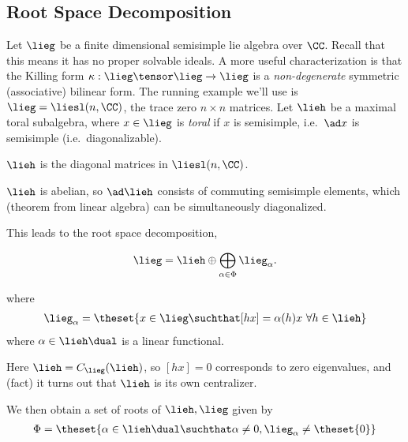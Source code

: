 \hypertarget{root-space-decomposition}{%
\subsection{Root Space Decomposition}\label{root-space-decomposition}}

Let \(\lieg\) be a finite dimensional semisimple lie algebra over
\(\CC\). Recall that this means it has no proper solvable ideals. A more
useful characterization is that the Killing form
\(\kappa: \lieg\tensor \lieg \to \lieg\) is a \emph{non-degenerate}
symmetric (associative) bilinear form. The running example we'll use is
\(\lieg = \liesl(n, \CC)\), the trace zero \(n\times n\) matrices. Let
\(\lieh\) be a maximal toral subalgebra, where \(x\in\lieg\) is
\emph{toral} if \(x\) is semisimple, i.e.~\(\ad x\) is semisimple
(i.e.~diagonalizable).

\begin{example}[?]

\(\lieh\) is the diagonal matrices in \(\liesl(n, \CC)\).

\end{example}

\begin{remark}

\(\lieh\) is abelian, so \(\ad \lieh\) consists of commuting semisimple
elements, which (theorem from linear algebra) can be simultaneously
diagonalized.

\end{remark}

\begin{definition}

This leads to the root space decomposition,

\begin{align*}
\lieg = \lieh \oplus \bigoplus_{\alpha\in \Phi} \lieg_\alpha
.\end{align*}

where
\begin{align*}
\lieg_\alpha = \theset{x\in \lieg \suchthat [h x] = \alpha(h) x ~\forall h\in \lieh}
\end{align*} where \(\alpha \in \lieh\dual\) is a linear functional.

\end{definition}

Here \(\lieh = C_\lieg(\lieh)\), so \([h x] = 0\) corresponds to zero
eigenvalues, and (fact) it turns out that \(\lieh\) is its own
centralizer.

\begin{definition}

We then obtain a set of roots of \(\lieh, \lieg\) given by
\begin{align*}
\Phi = \theset{\alpha\in\lieh\dual \suchthat \alpha\neq 0, \lieg_\alpha \neq \theset{0}}
\end{align*}

\end{definition}

